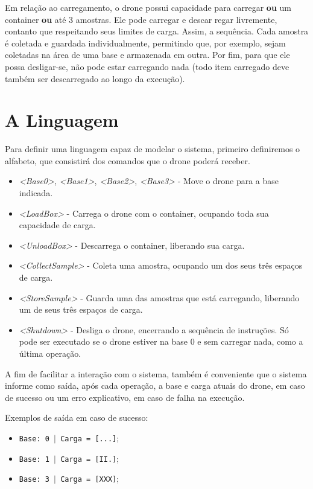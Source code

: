 \documentclass[12pt]{article}
\begin{document}
Em relação ao carregamento, o drone possui capacidade para carregar \textbf{ou} um container \textbf{ou} até 3 amostras. Ele pode carregar e descar regar livremente, contanto que respeitando seus limites de carga. Assim, a sequência. Cada amostra é coletada e guardada individualmente, permitindo que, por exemplo, sejam coletadas na área de uma base e armazenada em outra. Por fim, para que ele possa desligar-se, não pode estar carregando nada (todo item carregado deve também ser descarregado ao longo da execução). 

\section{A Linguagem}

Para definir uma linguagem capaz de modelar o sistema, primeiro definiremos o alfabeto, que consistirá dos comandos que o drone poderá receber.


\begin{itemize}
  \item \textit{\textless Base0\textgreater}, \textit{\textless Base1\textgreater}, \textit{\textless Base2\textgreater}, \textit{\textless Base3\textgreater} - Move o drone para a base indicada.
  \item \textit{\textless LoadBox\textgreater} - Carrega o drone com o container, ocupando toda sua capacidade de carga.
  \item \textit{\textless UnloadBox\textgreater} - Descarrega o container, liberando sua carga.
  \item \textit{\textless CollectSample\textgreater} - Coleta uma amostra, ocupando um dos seus três espaços de carga.
  \item \textit{\textless StoreSample\textgreater} - Guarda uma das amostras que está carregando, liberando um de seus três espaços de carga.
  \item \textit{\textless Shutdown\textgreater} - Desliga o drone, encerrando a sequência de instruções. Só pode ser executado se o drone estiver na base 0 e sem carregar nada, como a última operação.
\end{itemize}

A fim de facilitar a interação com o sistema, também é conveniente que o sistema informe como saída, após cada operação, a base e carga atuais do drone, em caso de sucesso ou um erro explicativo, em caso de falha na execução.

Exemplos de saída em caso de sucesso:
\begin{itemize}
    \item \texttt{Base: 0 $\mid$ Carga = [...]};
    \item \texttt{Base: 1 $\mid$ Carga = [II.]};
    \item \texttt{Base: 3 $\mid$ Carga = [XXX]};
\end{itemize}
\end{document}
